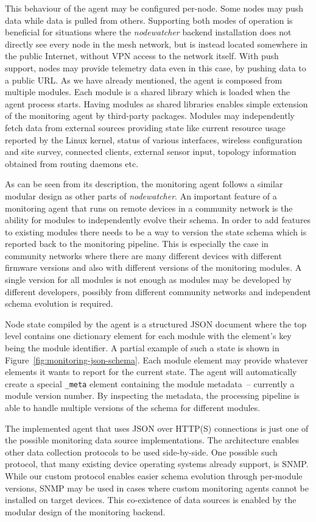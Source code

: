 \documentclass[5p,sort&compress]{elsarticle}
\newcommand{\nodewatcher}{\textit{nodewatcher}}
\begin{document}
This behaviour of the agent may be configured per-node.
Some nodes may push data while data is pulled from others.
Supporting both modes of operation is beneficial for situations where the \nodewatcher{} backend installation does not directly see every node in the mesh network, but is instead located somewhere in the public Internet, without VPN access to the network itself.
With push support, nodes may provide telemetry data even in this case, by pushing data to a public URL.
As we have already mentioned, the agent is composed from multiple modules.
Each module is a shared library which is loaded when the agent process starts.
Having modules as shared libraries enables simple extension of the monitoring agent by third-party packages.
Modules may independently fetch data from external sources providing state like current resource usage reported by the Linux kernel, status of various interfaces, wireless configuration and site survey, connected clients, external sensor input, topology information obtained from routing daemons etc.

As can be seen from its description, the monitoring agent follows a similar modular design as other parts of \nodewatcher{}.
An important feature of a monitoring agent that runs on remote devices in a community network is the ability for modules to independently evolve their schema.
In order to add features to existing modules there needs to be a way to version the state schema which is reported back to the monitoring pipeline.
This is especially the case in community networks where there are many different devices with different firmware versions and also with different versions of the monitoring modules.
A single version for all modules is not enough as modules may be developed by different developers, possibly from different community networks and independent schema evolution is required.

Node state compiled by the agent is a structured JSON document where the top level contains one dictionary element for each module with the element's key being the module identifier.
A partial example of such a state is shown in Figure~\ref{fig:monitoring-json-schema}.
Each module element may provide whatever elements it wants to report for the current state.
The agent will automatically create a special \texttt{\_meta} element containing the module metadata~-- currently a module version number.
By inspecting the metadata, the processing pipeline is able to handle multiple versions of the schema for different modules.

The implemented agent that uses JSON over HTTP(S) connections is just one of the possible monitoring data source implementations.
The architecture enables other data collection protocols to be used side-by-side.
One possible such protocol, that many existing device operating systems already support, is SNMP.
While our custom protocol enables easier schema evolution through per-module versions, SNMP may be used in cases where custom monitoring agents cannot be installed on target devices.
This co-existence of data sources is enabled by the modular design of the monitoring backend.
\end{document}
